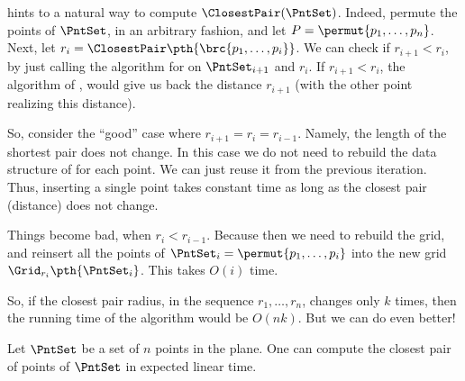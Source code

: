  hints to a natural way to compute
$\ClosestPair(\PntSet)$.  Indeed, permute the points of $\PntSet$, in
an arbitrary fashion, and let $P = \permut{p_1, \ldots, p_n}$. Next,
let $r_i = \ClosestPair\pth{\bigl.\brc{p_1,\ldots, p_i} }$. We can
check if $r_{i+1} < r_i$, by just calling the algorithm for
 on $\PntSet_{i+1}$ and $r_i$. If $r_{i+1} < r_i$,
the algorithm of , would give us back the distance
$r_{i+1}$ (with the other point realizing this distance).

So, consider the ``good'' case where $r_{i+1} = r_{i}=r_{i-1}$.
Namely, the length of the shortest pair does not change. In this case
we do not need to rebuild the data structure of  for
each point. We can just reuse it from the previous iteration. Thus,
inserting a single point takes constant time as long as the closest
pair (distance) does not change.

Things become bad, when $r_{i} < r_{i-1}$. Because then we need to
rebuild the grid, and reinsert all the points of
$\PntSet_i = \permut{p_1,\ldots, p_i}$ into the new grid
$\Grid_{r_i}\pth{\PntSet_i}$.  This takes $O(i)$ time.

So, if the closest pair radius, in the sequence $r_1,\ldots, r_n$,
changes only $k$ times, then the running time of the algorithm would
be $O(nk)$. But we can do even better!

\begin{theorem}
    Let $\PntSet$ be a set of $n$ points in the plane. One can compute
    the closest pair of points of $\PntSet$ in expected linear time.
\end{theorem}

